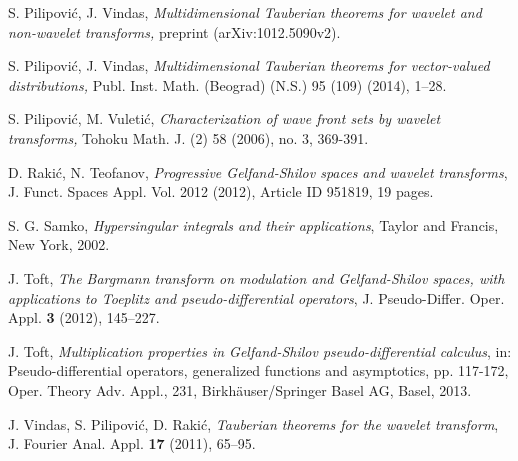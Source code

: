 \documentclass[reqno,12pt]{amsart}
\theoremstyle{plain}
\theoremstyle{definition}
\theoremstyle{remark}
\begin{document}
\begin{thebibliography}{99}
 S. Pilipovi\'{c},  J. Vindas, \textit{Multidimensional Tauberian
theorems for wavelet and non-wavelet transforms,} preprint (arXiv:1012.5090v2).

  S. Pilipovi\'{c},  J. Vindas,
 \textit{Multidimensional Tauberian theorems for vector-valued distributions,}
Publ. Inst. Math. (Beograd) (N.S.) {95 (109)} (2014), 1--28.

 S. Pilipovi\'c, M. Vuleti\'c,
 \textit{Characterization of wave front sets by wavelet transforms,}
 Tohoku Math. J. (2) 58 (2006), no. 3, 369-391.

 D. Raki\'c, N. Teofanov,
\textit{Progressive Gelfand-Shilov spaces and wavelet transforms}, J. Funct. Spaces Appl. Vol. 2012 (2012), Article ID 951819, 19 pages.

 S. G. Samko, \textit{Hypersingular integrals and their applications}, Taylor and Francis, New
York, 2002.

 J. Toft,
\textit{The Bargmann transform on modulation and Gelfand-Shilov spaces,
with applications to Toeplitz and pseudo-differential operators},
J. Pseudo-Differ. Oper. Appl. \textbf{3} (2012), 145--227.

 J. Toft,
\textit{Multiplication properties in Gelfand-Shilov pseudo-differential calculus},
in: Pseudo-differential operators, generalized functions and asymptotics, pp. 117-172,
Oper. Theory Adv. Appl., 231, Birkh\"auser/Springer Basel AG, Basel, 2013.

 J. Vindas, S. Pilipovi\'c, D. Raki\'c,
\textit{Tauberian theorems for the wavelet transform}, J. Fourier
Anal. Appl. \textbf{17}  (2011), 65--95.

\end{thebibliography}
\end{document}

